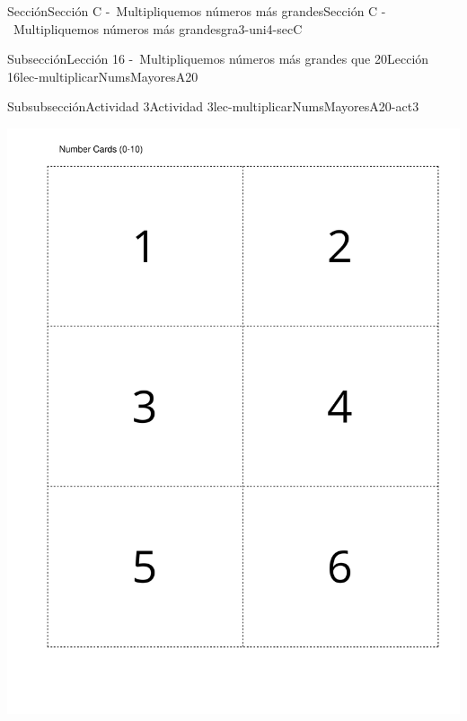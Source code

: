 \begin{sectionptx}{Sección}{Sección C -~Multipliquemos números más grandes}{}{Sección C -~Multipliquemos números más grandes}{}{}{gra3-uni4-secC}
\begin{subsectionptx}{Subsección}{Lección 16 -~Multipliquemos números más grandes que 20}{}{Lección 16}{}{}{lec-multiplicarNumsMayoresA20}
\begin{subsubsectionptx}{Subsubsección}{Actividad 3}{}{Actividad 3}{}{}{lec-multiplicarNumsMayoresA20-act3}
\begin{cutoutpage}
\begin{image}{0}{1}{0}{}
\includegraphics[page=3, rotate=90, scale=0.55, trim=40 40 20 40, clip, center] {external/blm/pdf-source/tarjetasDeDigitos.pdf}
\end{image}%
\begin{image}{0}{1}{0}{}%

\end{image}
\end{cutoutpage}
\end{subsubsectionptx}
\end{subsectionptx}
\end{sectionptx}
